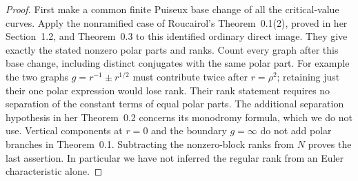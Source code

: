 \begin{proof}
First make a common finite Puiseux base change of all the
critical-value curves. Apply the nonramified case of Roucairol's
Theorem~0.1(2), proved in her Section~1.2, and Theorem~0.3
\cite{RoucairolFormal} to this identified ordinary direct image.
They give exactly the stated nonzero polar parts and ranks.
Count every graph after this base change, including distinct
conjugates with the same polar part. For example the two graphs
$g=r^{-1}\pm r^{1/2}$ must contribute twice after $r=\rho^2$;
retaining just their one polar expression would lose rank.
Their rank statement requires no separation of the constant terms
of equal polar parts. The additional separation hypothesis in her
Theorem~0.2 concerns its monodromy formula, which we do not use.
Vertical components at $r=0$ and the boundary $g=\infty$ do not
add polar branches in Theorem~0.1. Subtracting the nonzero-block
ranks from $N$ proves the last assertion. In particular we have
not inferred the regular rank from an Euler characteristic alone.
\end{proof}

